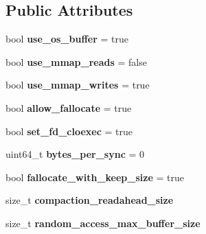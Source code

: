 \subsection*{Public Attributes}
\begin{DoxyCompactItemize}
\item 
bool {\bfseries use\+\_\+os\+\_\+buffer} = true\hypertarget{structrocksdb_1_1EnvOptions_a6e540588aa46118a79ae91ef620ee711}{}\label{structrocksdb_1_1EnvOptions_a6e540588aa46118a79ae91ef620ee711}

\item 
bool {\bfseries use\+\_\+mmap\+\_\+reads} = false\hypertarget{structrocksdb_1_1EnvOptions_a5c72ea7802f091ca6daa6c4722211265}{}\label{structrocksdb_1_1EnvOptions_a5c72ea7802f091ca6daa6c4722211265}

\item 
bool {\bfseries use\+\_\+mmap\+\_\+writes} = true\hypertarget{structrocksdb_1_1EnvOptions_ac07a355bb0a3d876f3c8c344ab5e8c41}{}\label{structrocksdb_1_1EnvOptions_ac07a355bb0a3d876f3c8c344ab5e8c41}

\item 
bool {\bfseries allow\+\_\+fallocate} = true\hypertarget{structrocksdb_1_1EnvOptions_a26296066fbb75476e6436b0b64fc5cfe}{}\label{structrocksdb_1_1EnvOptions_a26296066fbb75476e6436b0b64fc5cfe}

\item 
bool {\bfseries set\+\_\+fd\+\_\+cloexec} = true\hypertarget{structrocksdb_1_1EnvOptions_a2235129e25340b5970527ec2cce4aebd}{}\label{structrocksdb_1_1EnvOptions_a2235129e25340b5970527ec2cce4aebd}

\item 
uint64\+\_\+t {\bfseries bytes\+\_\+per\+\_\+sync} = 0\hypertarget{structrocksdb_1_1EnvOptions_a048b9773bcf18c325466e19d49f03fe4}{}\label{structrocksdb_1_1EnvOptions_a048b9773bcf18c325466e19d49f03fe4}

\item 
bool {\bfseries fallocate\+\_\+with\+\_\+keep\+\_\+size} = true\hypertarget{structrocksdb_1_1EnvOptions_a54b87413bd7df6d5fbdcdf04532f06a8}{}\label{structrocksdb_1_1EnvOptions_a54b87413bd7df6d5fbdcdf04532f06a8}

\item 
size\+\_\+t {\bfseries compaction\+\_\+readahead\+\_\+size}\hypertarget{structrocksdb_1_1EnvOptions_ac7275cb9afb4c346db0d9d160b42d004}{}\label{structrocksdb_1_1EnvOptions_ac7275cb9afb4c346db0d9d160b42d004}

\item 
size\+\_\+t {\bfseries random\+\_\+access\+\_\+max\+\_\+buffer\+\_\+size}\hypertarget{structrocksdb_1_1EnvOptions_a82bc43be4be53194894fa80da36cdb04}{}\label{structrocksdb_1_1EnvOptions_a82bc43be4be53194894fa80da36cdb04}


\end{DoxyCompactItemize}
